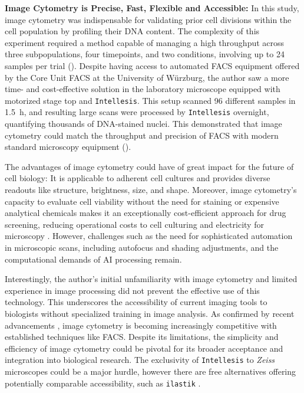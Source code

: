 \textbf{Image Cytometry is Precise, Fast, Flexible and Accessible:}
In this study, image cytometry was indispensable for validating prior cell
divisions within the \nMAina cell population by profiling their DNA content. The
complexity of this experiment required a method capable of managing a high
throughput across three subpopulations, four timepoints, and two conditions,
involving up to 24 samples per trial (). Despite
having access to automated \ac{FACS} equipment offered by the Core Unit FACS at
the University of Würzburg, the author saw a more time- and cost-effective
solution in the laboratory microscope equipped with motorized stage top and
\texttt{Intellesis}. This setup scanned 96 different samples in \SI{1.5}{\hour},
and resulting large scans were processed by \texttt{Intellesis} overnight,
quantifying thousands of DNA-stained nuclei. This demonstrated that image
cytometry could match the throughput and precision of \ac{FACS} with modern
standard microscopy equipment ().

The advantages of image cytometry could have of great impact for the future of
cell biology: It is applicable to adherent cell cultures
\cite{roukosCellCycleStaging2015} and provides diverse readouts like structure,
brightness, size, and shape. Moreover, image cytometry's capacity to evaluate
cell viability without the need for staining or expensive analytical chemicals
makes it an exceptionally cost-efficient approach for drug screening, reducing
operational costs to cell culturing and electricity for microscopy
\cite{pattaroneLearningDeepFeatures2021}.  However, challenges such as the need
for sophisticated automation in microscopic scans, including autofocus and
shading adjustments, and the computational demands of AI processing remain.


Interestingly, the author's initial unfamiliarity with image cytometry and
limited experience in image processing did not prevent the effective use of this
technology. This underscores the accessibility of current imaging tools to
biologists without specialized training in image analysis. As confirmed by
recent advancements \cite{nittaRapidHighthroughputCell2023}, image cytometry is
becoming increasingly competitive with established techniques like \ac{FACS}.
Despite its limitations, the simplicity and efficiency of image cytometry could
be pivotal for its broader acceptance and integration into biological research.
The exclusivity of \texttt{Intellesis} to \textit{Zeiss} microscopes could be a
major hurdle, however there are free alternatives offering potentially comparable
accessibility, such as \texttt{ilastik} \cite{bergIlastikInteractiveMachine2019}.



